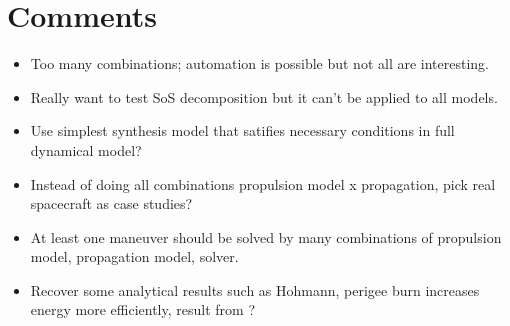 \section{Comments}

\begin{itemize}
    \item Too many combinations; automation is possible but not all are interesting.
    \item Really want to test SoS decomposition but it can't be applied to all models.
    \item Use simplest synthesis model that satifies necessary conditions in full dynamical model?
    \item Instead of doing all combinations propulsion model x propagation, pick real spacecraft as case studies?
    \item At least one maneuver should be solved by many combinations of propulsion model, propagation model, solver.
    \item Recover some analytical results such as Hohmann, perigee burn increases energy more efficiently, result from \cite{sandro_quasi_circ}?
\end{itemize}